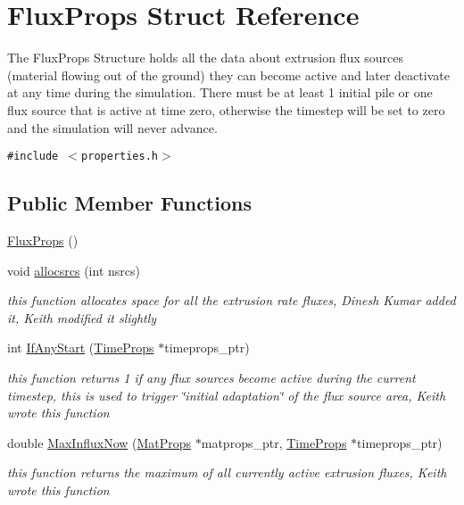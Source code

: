 \hypertarget{structFluxProps}{
\section{Flux\-Props Struct Reference}
\label{structFluxProps}
}
The Flux\-Props Structure holds all the data about extrusion flux sources (material flowing out of the ground) they can become active and later deactivate at any time during the simulation. There must be at least 1 initial pile or one flux source that is active at time zero, otherwise the timestep will be set to zero and the simulation will never advance.  


{\tt \#include $<$properties.h$>$}

\subsection*{Public Member Functions}
\begin{CompactItemize}
\item 
\hyperlink{structFluxProps_a0}{Flux\-Props} ()
\item 
void \hyperlink{structFluxProps_a1}{allocsrcs} (int nsrcs)
\begin{CompactList}\small\item\em this function allocates space for all the extrusion rate fluxes, Dinesh Kumar added it, Keith modified it slightly \item\end{CompactList}\item 
int \hyperlink{structFluxProps_a2}{If\-Any\-Start} (\hyperlink{structTimeProps}{Time\-Props} $\ast$timeprops\_\-ptr)
\begin{CompactList}\small\item\em this function returns 1 if any flux sources become active during the current timestep, this is used to trigger \char`\"{}initial adaptation\char`\"{} of the flux source area, Keith wrote this function \item\end{CompactList}\item 
double \hyperlink{structFluxProps_a3}{Max\-Influx\-Now} (\hyperlink{structMatProps}{Mat\-Props} $\ast$matprops\_\-ptr, \hyperlink{structTimeProps}{Time\-Props} $\ast$timeprops\_\-ptr)
\begin{CompactList}\small\item\em this function returns the maximum of all currently active extrusion fluxes, Keith wrote this function \item\end{CompactList}\end{CompactItemize}
